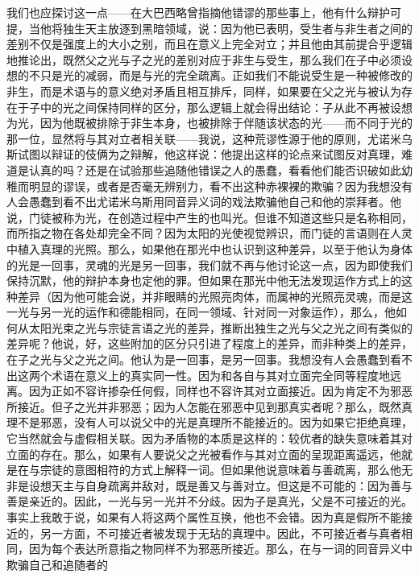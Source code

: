 我们也应探讨这一点——在大巴西略曾指摘他错谬的那些事上，他有什么辩护可提，当他将独生天主放逐到黑暗领域，说：因为他已表明，受生者与非生者之间的差别不仅是强度上的大小之别，而且在意义上完全对立；并且他由其前提合乎逻辑地推论出，既然父之光与子之光的差别对应于非生与受生，那么我们在子中必须设想的不只是光的减弱，而是与光的完全疏离。正如我们不能说受生是一种被修改的非生，而是术语与的意义绝对矛盾且相互排斥，同样，如果要在父之光与被认为存在于子中的光之间保持同样的区分，那么逻辑上就会得出结论：子从此不再被设想为光，因为他既被排除于非生本身，也被排除于伴随该状态的光——而不同于光的那一位，显然将与其对立者相关联——我说，这种荒谬性源于他的原则，尤诺米乌斯试图以辩证的伎俩为之辩解，他这样说：他提出这样的论点来试图反对真理，难道是认真的吗？还是在试验那些追随他错误之人的愚蠢，看看他们能否识破如此幼稚而明显的谬误，或者是否毫无辨别力，看不出这种赤裸裸的欺骗？因为我想没有人会愚蠢到看不出尤诺米乌斯用同音异义词的戏法欺骗他自己和他的崇拜者。他说，门徒被称为光，在创造过程中产生的也叫光。但谁不知道这些只是名称相同，而所指之物在各处却完全不同？因为太阳的光使视觉辨识，而门徒的言语则在人灵中植入真理的光照。那么，如果他在那光中也认识到这种差异，以至于他认为身体的光是一回事，灵魂的光是另一回事，我们就不再与他讨论这一点，因为即使我们保持沉默，他的辩护本身也定他的罪。但如果在那光中他无法发现运作方式上的这种差异（因为他可能会说，并非眼睛的光照亮肉体，而属神的光照亮灵魂，而是这一光与另一光的运作和德能相同，在同一领域、针对同一对象运作），那么，他如何从太阳光束之光与宗徒言语之光的差异，推断出独生之光与父之光之间有类似的差异呢？他说，好，这些附加的区分只引进了程度上的差异，而非种类上的差异，在子之光与父之光之间。他认为是一回事，是另一回事。我想没有人会愚蠢到看不出这两个术语在意义上的真实同一性。因为和各自与其对立面完全同等程度地远离。因为正如不容许掺杂任何假，同样也不容许其对立面接近。因为肯定不为邪恶所接近。但子之光并非邪恶；因为人怎能在邪恶中见到那真实者呢？那么，既然真理不是邪恶，没有人可以说父中的光是真理所不能接近的。因为如果它拒绝真理，它当然就会与虚假相关联。因为矛盾物的本质是这样的：较优者的缺失意味着其对立面的存在。那么，如果有人要说父之光被看作与其对立面的呈现距离遥远，他就是在与宗徒的意图相符的方式上解释一词。但如果他说意味着与善疏离，那么他无非是设想天主与自身疏离并敌对，既是善又与善对立。但这是不可能的：因为善与善是亲近的。因此，一光与另一光并不分歧。因为子是真光，父是不可接近的光。事实上我敢于说，如果有人将这两个属性互换，他也不会错。因为真是假所不能接近的，另一方面，不可接近者被发现于无玷的真理中。因此，不可接近者与真者相同，因为每个表达所意指之物同样不为邪恶所接近。那么，在与一词的同音异义中欺骗自己和追随者的